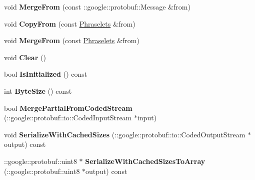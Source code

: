 \begin{DoxyCompactItemize}
\item 
\hypertarget{classlattice_1_1Phraselets_aea0701d2263901e124d9f4eb0ebb586e}{
void {\bfseries MergeFrom} (const ::google::protobuf::Message \&from)}
\label{classlattice_1_1Phraselets_aea0701d2263901e124d9f4eb0ebb586e}

\item 
\hypertarget{classlattice_1_1Phraselets_ac35d667378bb57992378580af8e2a42b}{
void {\bfseries CopyFrom} (const \hyperlink{classlattice_1_1Phraselets}{Phraselets} \&from)}
\label{classlattice_1_1Phraselets_ac35d667378bb57992378580af8e2a42b}

\item 
\hypertarget{classlattice_1_1Phraselets_a09cc9a5dad7bad0248ab26275d7d3151}{
void {\bfseries MergeFrom} (const \hyperlink{classlattice_1_1Phraselets}{Phraselets} \&from)}
\label{classlattice_1_1Phraselets_a09cc9a5dad7bad0248ab26275d7d3151}

\item 
\hypertarget{classlattice_1_1Phraselets_a4c735228e79edaf401ac7d08d35b53ac}{
void {\bfseries Clear} ()}
\label{classlattice_1_1Phraselets_a4c735228e79edaf401ac7d08d35b53ac}

\item 
\hypertarget{classlattice_1_1Phraselets_a4a9cdf5ab0725a87acb7831f572878ee}{
bool {\bfseries IsInitialized} () const }
\label{classlattice_1_1Phraselets_a4a9cdf5ab0725a87acb7831f572878ee}

\item 
\hypertarget{classlattice_1_1Phraselets_a26f51d307c09dc6a01c1c3a83afa898d}{
int {\bfseries ByteSize} () const }
\label{classlattice_1_1Phraselets_a26f51d307c09dc6a01c1c3a83afa898d}

\item 
\hypertarget{classlattice_1_1Phraselets_aa939d6bdfd0a634d857f62f92cacda8c}{
bool {\bfseries MergePartialFromCodedStream} (::google::protobuf::io::CodedInputStream $\ast$input)}
\label{classlattice_1_1Phraselets_aa939d6bdfd0a634d857f62f92cacda8c}

\item 
\hypertarget{classlattice_1_1Phraselets_a27a2c9b71879c29dfe115e4907abbc72}{
void {\bfseries SerializeWithCachedSizes} (::google::protobuf::io::CodedOutputStream $\ast$output) const }
\label{classlattice_1_1Phraselets_a27a2c9b71879c29dfe115e4907abbc72}

\item 
\hypertarget{classlattice_1_1Phraselets_a20e070569fad10cdf5d9327fd1d5f63c}{
::google::protobuf::uint8 $\ast$ {\bfseries SerializeWithCachedSizesToArray} (::google::protobuf::uint8 $\ast$output) const }
\label{classlattice_1_1Phraselets_a20e070569fad10cdf5d9327fd1d5f63c}


\end{DoxyCompactItemize}
